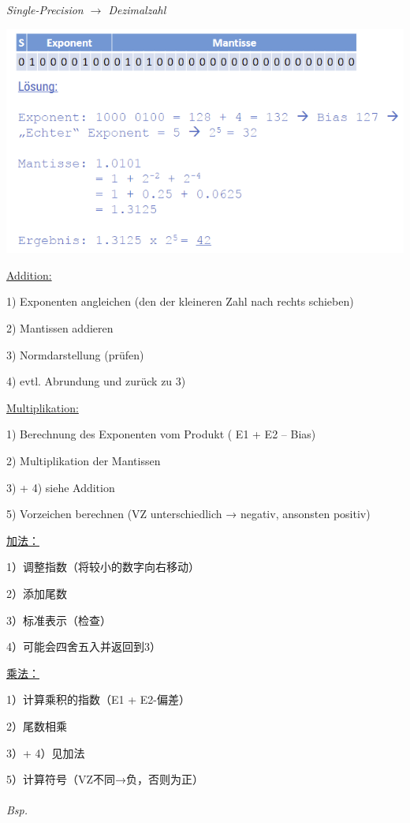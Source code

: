 \documentclass[fleqn]{article}
\begin{document}
\noindent\textit{Single-Precision $\rightarrow$ Dezimalzahl}

\begin{center}
    \includegraphics[scale=0.5]{21.png}
\end{center}

\noindent\underline{Addition:}

1) Exponenten angleichen (den der kleineren Zahl nach rechts schieben)

2) Mantissen addieren

3) Normdarstellung (prüfen)

4) evtl. Abrundung und zurück zu 3)

\noindent\underline{Multiplikation:}

1) Berechnung des Exponenten vom Produkt ( E1 +  E2 – Bias)

2) Multiplikation der Mantissen

3) + 4) siehe Addition

5) Vorzeichen berechnen (VZ unterschiedlich → negativ, ansonsten positiv)

\noindent\underline{加法：}

1）调整指数（将较小的数字向右移动）

2）添加尾数

3）标准表示（检查）

4）可能会四舍五入并返回到3）

\noindent\underline{乘法：}

1）计算乘积的指数（E1 + E2-偏差）

2）尾数相乘

3）+ 4）见加法

5）计算符号（VZ不同→负，否则为正）
\\
\\
\noindent\textit{Bsp.}
\end{document}
